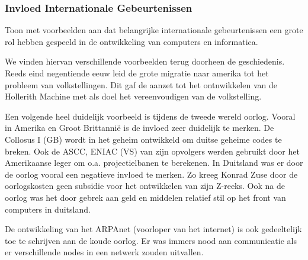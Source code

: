 \documentclass[../main.tex]{subfiles}
\begin{document}
\subsubsection{Invloed Internationale Gebeurtenissen}
\begin{question}
Toon met voorbeelden aan dat belangrijke internationale gebeurtenissen een grote rol hebben gespeeld in de ontwikkeling van computers en informatica.
\end{question}
\begin{solution}
		We vinden hiervan verschillende voorbeelden terug doorheen de geschiedenis.
		Reeds eind negentiende eeuw leid de grote migratie naar amerika tot het probleem van volkstellingen.
		Dit gaf de aanzet tot het ontnwikkelen van de Hollerith Machine met als doel het vereenvoudigen van de volkstelling.

		Een volgende heel duidelijk voorbeeld is tijdens de tweede wereld oorlog.
		Vooral in Amerika en Groot Brittanni\"e is de invloed zeer duidelijk te merken.
		De Collosus I (GB) wordt in het geheim ontwikkeld om duitse geheime codes te breken.
		Ook de ASCC, ENIAC (VS) van zijn opvolgers werden gebruikt door het Amerikaanse leger om o.a. projectielbanen te berekenen.
		In Duitsland was er door de oorlog vooral een negatieve invloed te merken.
		Zo kreeg Konrad Zuse door de oorlogskosten geen subsidie voor het ontwikkelen van zijn Z-reeks.
		Ook na de oorlog was het door gebrek aan geld en middelen relatief stil op het front van computers in duitsland.

		De ontwikkeling van het ARPAnet (voorloper van het internet) is ook gedeeltelijk toe te schrijven aan de koude oorlog.
		Er was immers nood aan communicatie als er verschillende nodes in een netwerk zouden uitvallen.
\end{solution}
\end{document}
